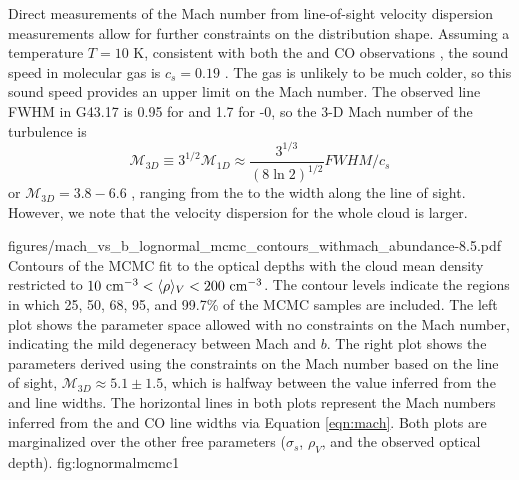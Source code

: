 % 
Direct measurements of the Mach number from line-of-sight velocity dispersion
measurements allow for further constraints on the distribution shape.  Assuming
a temperature $T=10$ K, consistent with both the \formaldehyde and CO
observations \citep{Plume2004a}, the sound speed in molecular gas is $c_s=0.19$
\kms.  The gas is unlikely to be much colder, so this sound speed provides an
upper limit on the Mach number.  The observed line FWHM in G43.17 is 0.95 \kms
for \formaldehyde and 1.7 \kms for -0,
so the 3-D Mach number of the turbulence is \citep{Schneider2013a}
\begin{equation}
    \label{eqn:mach}
    \mathcal{M}_{3D} \equiv 3^{1/2} \mathcal{M}_{1D} \approx \frac{3^{1/3}}{(8\ln 2)^{1/2}} FWHM / c_s 
\end{equation}
or $\mathcal{M}_{3D} = 3.8 - 6.6 $ , ranging from the \formaldehyde to the \thirteenco width along
the \north line of sight.  However, we note that the velocity dispersion for the whole cloud is
larger.

          {figures/mach_vs_b_lognormal_mcmc_contours_withmach_abundance-8.5.pdf}
{Contours of the MCMC fit to the \formaldehyde optical depths with the cloud
mean density restricted to $10~\textrm{cm}^{-3} < \langle\rho\rangle_V < 200~\textrm{cm}^{-3}$.  The contour
levels indicate the regions in which 25, 50, 68, 95, and 99.7\% of the MCMC
samples are included. The left plot shows the parameter space allowed with no
constraints on the Mach number, indicating the mild degeneracy between Mach and
$b$.  The right plot shows the parameters derived using the constraints on the
Mach number based on the \north line of sight, $\mathcal{M}_{3D}\approx5.1\pm1.5$, which is
halfway between the value inferred from the \formaldehyde and \thirteenco line widths.  
The horizontal lines in both plots represent the Mach numbers inferred from the
\formaldehyde and CO line widths via Equation \ref{eqn:mach}.  Both plots are marginalized
over the other free parameters ($\sigma_s$, $\rho_V$, and the observed optical depth).
}{fig:lognormalmcmc}{1}%

